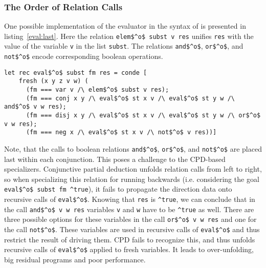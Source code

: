 \subsubsection{The Order of Relation Calls}

One possible implementation of the evaluator in the syntax of \oc is presented in listing~\ref{eval:last}.
Here the relation \lstinline{elem$^o$ subst v res} unifies \lstinline{res} with the value of the variable \lstinline{v} in the list \lstinline{subst}.
The relations \lstinline{and$^o$}, \lstinline{or$^o$}, and \lstinline{not$^o$} encode corresponding boolean operations.

\begin{figure*}[!h]
  \centering
  \begin{minipage}{0.95\textwidth}
    \begin{lstlisting}[label={eval:last}, caption={Evaluator of formulas with boolean operation last}, captionpos=b, frame=tb]
  let rec eval$^o$ subst fm res = conde [
    fresh (x y z v w) (
      (fm === var v /\ elem$^o$ subst v res);
      (fm === conj x y /\ eval$^o$ st x v /\ eval$^o$ st y w /\ and$^o$ v w res);
      (fm === disj x y /\ eval$^o$ st x v /\ eval$^o$ st y w /\ or$^o$ v w res);
      (fm === neg x /\ eval$^o$ st x v /\ not$^o$ v res))]
    \end{lstlisting}
  \end{minipage}
\end{figure*}

Note, that the calls to boolean relations \lstinline{and$^o$}, \lstinline{or$^o$}, and \lstinline{not$^o$} are placed last within each conjunction.
This poses a challenge to the CPD-based specializers.
Conjunctive partial deduction unfolds relation calls from left to right, so when specializing this relation for running backwards (i.e. considering the goal \lstinline{eval$^o$ subst fm ^true}), it fails to propagate the direction data onto recursive calls of \lstinline{eval$^o$}.
Knowing that \lstinline{res} is \lstinline{^true}, we can conclude that in the call \lstinline{and$^o$ v w res} variables \lstinline{v} and \lstinline{w} have to be \lstinline{^true} as well.
There are three possible options for these variables in the call \lstinline{or$^o$ v w res} and one for the call \lstinline{not$^o$}.
These variables are used in recursive calls of \lstinline{eval$^o$} and thus restrict the result of driving them.
CPD fails to recognize this, and thus unfolds recursive calls of \lstinline{eval$^o$} applied to fresh variables.
It leads to over-unfolding, big residual programs and poor performance.

